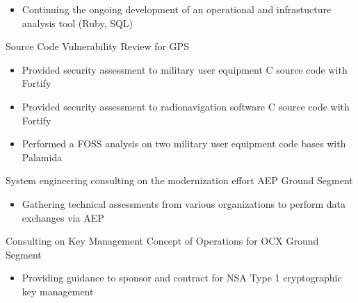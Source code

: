 \documentclass[letterpaper]{clinton-resume}
\begin{document}
\begin{minipage}[t]{0.66\textwidth}
\begin{tightitemize}
\begin{itemize}
		\item Continuing the ongoing development of an operational and infrastucture analysis tool (Ruby, SQL)
	\end{itemize}
\item Source Code Vulnerability Review for GPS
	\begin{itemize}
		\item Provided security assessment to military user equipment C source code with Fortify
		\item Provided security assessment to radionavigation software  C source code with Fortify
		\item Performed a FOSS analysis on two military user equipment code bases with Palamida
	\end{itemize}
\item System engineering consulting on the modernization effort AEP Ground Segment
	\begin{itemize}
		\item Gathering technical assessments from various organizations to perform data exchanges via AEP
	\end{itemize}
\item Consulting on Key Management Concept of Operations for OCX Ground Segment
	\begin{itemize}
		\item Providing guidance to sponsor and contract for NSA Type 1 cryptographic key management
	\end{itemize}
\end{tightitemize}


\end{minipage}
\end{document}
